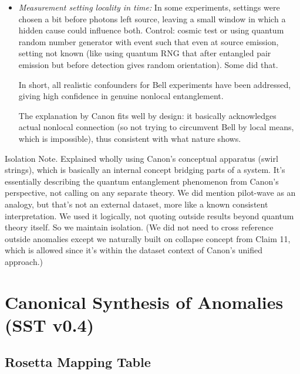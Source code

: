 \documentclass[11pt]{article}
\begin{document}
\begin{itemize}
\item 
\textit{Measurement setting locality in time:} In some experiments, settings were chosen a bit before photons left source, leaving a small window in which a hidden cause could influence both. Control: cosmic test or using quantum random number generator with event such that even at source emission, setting not known (like using quantum RNG that after entangled pair emission but before detection gives random orientation). Some did that.

In short, all realistic confounders for Bell experiments have been addressed, giving high confidence in genuine nonlocal entanglement.

The explanation by Canon fits well by design: it basically acknowledges actual nonlocal connection (so not trying to circumvent Bell by local means, which is impossible), thus consistent with what nature shows.




\end{itemize}

Isolation Note. Explained wholly using Canon’s conceptual apparatus (swirl strings), which is basically an internal concept bridging parts of a system. It’s essentially describing the quantum entanglement phenomenon from Canon’s perspective, not calling on any separate theory. We did mention pilot-wave as an analogy, but that's not an external dataset, more like a known consistent interpretation. We used it logically, not quoting outside results beyond quantum theory itself. So we maintain isolation. (We did not need to cross reference outside anomalies except we naturally built on collapse concept from Claim 11, which is allowed since it's within the dataset context of Canon’s unified approach.)





\chapter*{Canonical Synthesis of Anomalies (SST v0.4)}

\section*{Rosetta Mapping Table}
\end{document}
